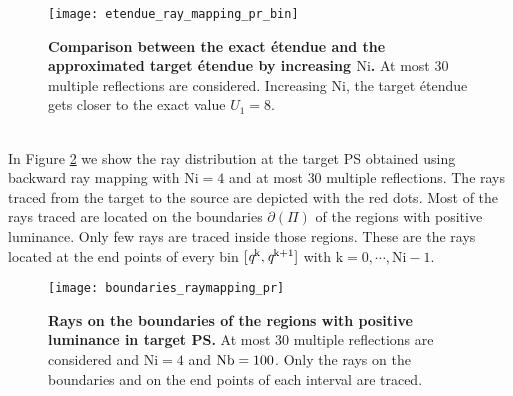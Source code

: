 \begin{figure}[t]
  \begin{center}
  \texttt{[image: etendue\_ray\_mapping\_pr\_bin]}
  \end{center}
  \caption{\textbf{Comparison between the exact \'{e}tendue and the approximated target \'{e}tendue by increasing $\textrm{Ni}$.}
 At most $30$ multiple reflections are considered. Increasing $\textrm{Ni}$, the target \'{e}tendue gets closer to the exact value $U_1=8$.}
\label{fig:etendue_ray_mapping_pr_bin}
 \end{figure}
\\ \indent In Figure \ref{fig:boundaries_rays_pr_raymapping} we show the ray distribution at the target PS obtained using backward ray mapping with $\textrm{Ni}=4$ and at most $30$ multiple reflections. The rays traced from the target to the source are depicted with the red dots. Most of the rays traced are located on the boundaries $\partial$$(\Pi)$ of the regions with positive luminance. 
Only few rays are traced inside those regions. These are the rays located at the end points of every bin $[\textit{q}^{\textrm{k}}, \textit{q}^{\textrm{k}+1}]$ with $\textrm{k}=0, \cdots, \textrm{Ni}-1$. 
\begin{figure}[h]
  \begin{center}
  \texttt{[image: boundaries\_raymapping\_pr]}
  \end{center}
  \caption{\textbf{Rays on the boundaries of the regions with positive luminance in target PS.}
 At most $30$ multiple reflections are considered and $\textrm{Ni}=4$ and $\textrm{Nb} = 100$. Only the rays on the boundaries and on the end points of each interval are traced.}
\label{fig:boundaries_rays_pr_raymapping}
 \end{figure}
\\ \indent
